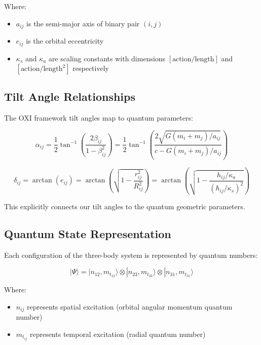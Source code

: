 \documentclass{article}
\begin{document}
Where:
\begin{itemize}
\item $a_{ij}$ is the semi-major axis of binary pair $(i,j)$
\item $e_{ij}$ is the orbital eccentricity
\item $\kappa_s$ and $\kappa_a$ are scaling constants with dimensions $[\text{action}/\text{length}]$ and $[\text{action}/\text{length}^2]$ respectively
\end{itemize}

\subsection{Tilt Angle Relationships}

The OXI framework tilt angles map to quantum parameters:

\begin{equation}
\alpha_{ij} = \frac{1}{2}\tan^{-1}\left(\frac{2\beta_{ij}}{1-\beta_{ij}^2}\right) = \frac{1}{2}\tan^{-1}\left(\frac{2\sqrt{G(m_i+m_j)/a_{ij}}}{c-G(m_i+m_j)/a_{ij}}\right)
\end{equation}

\begin{equation}
\delta_{ij} = \arctan(e_{ij}) = \arctan\left(\sqrt{1-\frac{r_{ij}^2}{R_{ij}^2}}\right) = \arctan\left(\sqrt{1-\frac{h_{ij}/\kappa_a}{(\hbar_{ij}/\kappa_s)^2}}\right)
\end{equation}

This explicitly connects our tilt angles to the quantum geometric parameters.

\subsection{Quantum State Representation}

Each configuration of the three-body system is represented by quantum numbers:

\begin{equation}
|\Psi\rangle = |n_{12}, m_{t_{12}}\rangle \otimes |n_{23}, m_{t_{23}}\rangle \otimes |n_{31}, m_{t_{31}}\rangle
\end{equation}

Where:
\begin{itemize}
\item $n_{ij}$ represents spatial excitation (orbital angular momentum quantum number)
\item $m_{t_{ij}}$ represents temporal excitation (radial quantum number)
\end{itemize}
\end{document}
